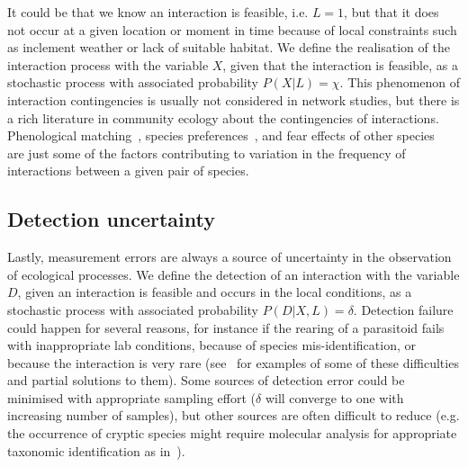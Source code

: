 \documentclass[12pt]{article}
\begin{document}
    It could be that we know an interaction is feasible, i.e. $L=1$, but that it does not occur at a given location or moment in time because of local constraints such as inclement weather or lack of suitable habitat. We define the realisation of the interaction process with the variable $X$, given that the interaction is feasible, as a stochastic process with associated probability $P(X|L)=\chi$. This phenomenon of interaction contingencies is usually not considered in network studies, but there is a rich literature in community ecology about the contingencies of interactions. Phenological matching~\citep{MillerRushing2010,Gezon2016}, species preferences~\citep{Pires2011,Novak2015,Coux2016}, and fear effects of other species~\citep{} are just some of the factors contributing to variation in the frequency of interactions between a given pair of species.

    \subsection*{Detection uncertainty} 

    Lastly, measurement errors are always a source of uncertainty in the observation of ecological processes. We define the detection of an interaction with the variable $D$, given an interaction is feasible and occurs in the local conditions, as a stochastic process with associated probability $P(D|X,L)=\delta$. Detection failure could happen for several reasons, for instance if the rearing of a parasitoid fails with inappropriate lab conditions, because of species mis-identification, or because the interaction is very rare (see~\citet{Wirta2014,FrostXX} for examples of some of these difficulties and partial solutions to them). Some sources of detection error could be minimised with appropriate sampling effort ($\delta$ will converge to one with increasing number of samples), but other sources are often difficult to reduce (e.g. the occurrence of cryptic species might require molecular analysis for appropriate taxonomic identification as in~\citet{Wirta2014,FrostXX}).
\end{document}

